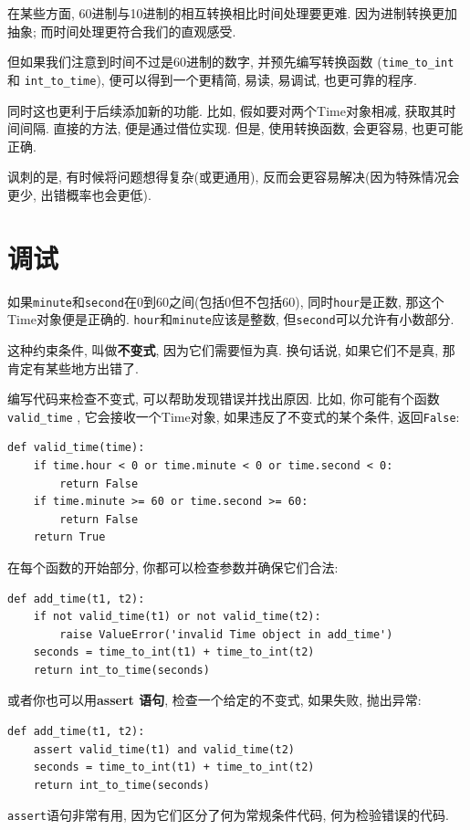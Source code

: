 \documentclass[10pt]{book}
\begin{document}
在某些方面, 60进制与10进制的相互转换相比时间处理要更难. 
因为进制转换更加抽象;
而时间处理更符合我们的直观感受. 

但如果我们注意到时间不过是60进制的数字, 并预先编写转换函数 (\verb"time_to_int"
和 \verb"int_to_time"), 便可以得到一个更精简, 易读, 易调试, 也更可靠的程序. 

同时这也更利于后续添加新的功能. 
比如, 假如要对两个Time对象相减, 获取其时间间隔. 
直接的方法, 便是通过借位实现. 
但是, 使用转换函数, 会更容易, 也更可能正确. 

讽刺的是, 有时候将问题想得复杂(或更通用), 反而会更容易解决(因为特殊情况会更少, 
出错概率也会更低).


\section{调试}

如果{\tt minute}和{\tt second}在0到60之间(包括0但不包括60),
同时{\tt hour}是正数, 那这个Time对象便是正确的. 
{\tt hour}和{\tt minute}应该是整数, 但{\tt second}可以允许有小数部分. 

这种约束条件, 叫做{\bf 不变式}, 因为它们需要恒为真. 
换句话说, 如果它们不是真, 那肯定有某些地方出错了. 

编写代码来检查不变式, 可以帮助发现错误并找出原因. 
比如, 你可能有个函数\verb"valid_time" , 它会接收一个Time对象, 
如果违反了不变式的某个条件, 返回{\tt False}:

\begin{verbatim}
def valid_time(time):
    if time.hour < 0 or time.minute < 0 or time.second < 0:
        return False
    if time.minute >= 60 or time.second >= 60:
        return False
    return True
\end{verbatim}
%
在每个函数的开始部分, 你都可以检查参数并确保它们合法:

\begin{verbatim}
def add_time(t1, t2):
    if not valid_time(t1) or not valid_time(t2):
        raise ValueError('invalid Time object in add_time')
    seconds = time_to_int(t1) + time_to_int(t2)
    return int_to_time(seconds)
\end{verbatim}
%
或者你也可以用{\bf assert 语句}, 检查一个给定的不变式, 如果失败, 抛出异常:

\begin{verbatim}
def add_time(t1, t2):
    assert valid_time(t1) and valid_time(t2)
    seconds = time_to_int(t1) + time_to_int(t2)
    return int_to_time(seconds)
\end{verbatim}
%
{\tt assert}语句非常有用, 因为它们区分了何为常规条件代码, 何为检验错误的代码. 
\end{document}
